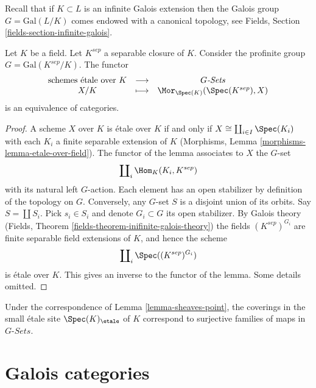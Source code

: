 \medskip\noindent
Recall that if $K \subset L$ is an infinite Galois extension then the
Galois group $G = \text{Gal}(L/K)$ comes endowed with a canonical
topology, see Fields, Section \ref{fields-section-infinite-galois}.

\begin{lemma}
\label{lemma-sheaves-point}
Let $K$ be a field. Let $K^{sep}$ a separable closure of $K$.
Consider the profinite group $G = \text{Gal}(K^{sep}/K)$.
The functor
$$
\begin{matrix}
\text{schemes \'etale over }K &
\longrightarrow &
G\textit{-Sets} \\
X/K & \longmapsto &
\Mor_{\Spec(K)}(\Spec(K^{sep}), X)
\end{matrix}
$$
is an equivalence of categories.
\end{lemma}

\begin{proof}
A scheme $X$ over $K$ is \'etale over $K$ if and only if
$X \cong \coprod_{i\in I} \Spec(K_i)$ with
each $K_i$ a finite separable extension of $K$
(Morphisms, Lemma \ref{morphisms-lemma-etale-over-field}).
The functor of the lemma associates to $X$ the $G$-set
$$
\coprod\nolimits_i \Hom_K(K_i, K^{sep})
$$
with its natural left $G$-action. Each element has an open stabilizer
by definition of the topology on $G$. Conversely, any $G$-set $S$
is a disjoint union of its orbits. Say $S = \coprod S_i$. Pick $s_i \in S_i$
and denote $G_i \subset G$ its open stabilizer. By Galois theory
(Fields, Theorem \ref{fields-theorem-inifinite-galois-theory})
the fields $(K^{sep})^{G_i}$ are finite separable field extensions of $K$, and
hence the scheme
$$
\coprod\nolimits_i \Spec((K^{sep})^{G_i})
$$
is \'etale over $K$. This gives an inverse to the functor of the lemma.
Some details omitted.
\end{proof}

\begin{remark}
\label{remark-covering-surjective}
Under the correspondence of Lemma \ref{lemma-sheaves-point},
the coverings in the small \'etale site
$\Spec(K)_\etale$ of $K$ correspond to surjective families of
maps in $G\textit{-Sets}$.
\end{remark}









\section{Galois categories}
\label{section-galois}

